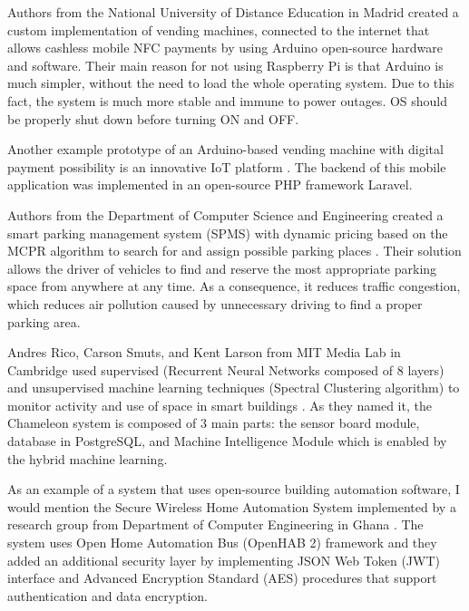 \documentclass[fleqn,10pt]{olplainarticle}
\begin{document}
Authors from the National University of Distance Education in Madrid \cite{Solano2017} created a custom implementation of vending machines, connected to the internet that allows cashless mobile NFC payments by using Arduino open-source hardware and software. Their main reason for not using Raspberry Pi is that Arduino is much simpler, without the need to load the whole operating system. Due to this fact, the system is much more stable and immune to power outages. OS should be properly shut down before turning ON and OFF.

\vskip10pt

Another example prototype of an Arduino-based vending machine with digital payment possibility is an innovative IoT platform \cite{Alam2021}. The backend of this mobile application was implemented in an open-source PHP framework Laravel.

\vskip10pt

Authors from the Department of Computer Science and Engineering created a smart parking management system (SPMS) with dynamic pricing based on the MCPR algorithm to search for and assign possible parking places \cite{Mondal2021}. Their solution allows the driver of vehicles to find and reserve the most appropriate parking space from anywhere at any time. As a consequence, it reduces traffic congestion, which reduces air pollution caused by unnecessary driving to find a proper parking area.

\vskip10pt

Andres Rico, Carson Smuts, and Kent Larson from MIT Media Lab in Cambridge used supervised (Recurrent Neural Networks composed of 8 layers) and unsupervised machine learning techniques (Spectral Clustering algorithm) to monitor activity and use of space in smart buildings \cite{Rico2022}. As they named it, the Chameleon system is composed of 3 main parts: the sensor board module, database in PostgreSQL, and Machine Intelligence Module which is enabled by the hybrid machine learning.

\vskip10pt

As an example of a system that uses open-source building automation software, I would mention the Secure Wireless Home Automation System implemented by a research group from Department of Computer Engineering in Ghana \cite{Sowah2020}. The system uses Open Home Automation Bus (OpenHAB 2) framework and they added an additional security layer by implementing JSON Web Token (JWT) interface and Advanced Encryption Standard (AES) procedures that support authentication and data encryption.
\end{document}
